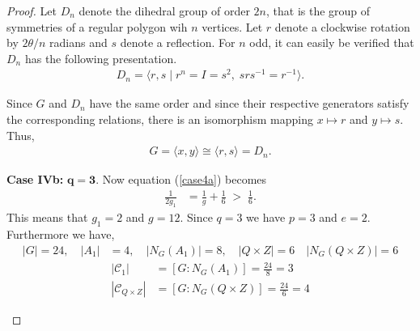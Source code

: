 \documentclass[a4paper , 11pt]{book}
\theoremstyle{definition}
\theoremstyle{remark}
\begin{document}
\begin{proof}
Let $D_n$ denote the dihedral group of order $2n$, that is the group of symmetries of a regular polygon wih $n$ vertices. Let $r$ denote a clockwise rotation by $2\theta /n$ radians and $s$ denote a reflection. For $n$ odd, it can easily be verified that $D_n$ has the following presentation.
\begin{align*} D_n = \langle r, s \; | \; r^n = I = s^2, \; s r s^{-1} = r^{-1} \rangle.
\end{align*}

Since $G$ and $D_n$ have the same order and since their respective generators satisfy the corresponding relations, there is an isomorphism mapping $x \mapsto r$ and $y \mapsto s$. Thus,
\begin{align*} G = \langle x, y \rangle \cong \langle r, s \rangle = D_n.
\end{align*}

\textbullet \space \textbf{Case IVb:} $\pmb{q = 3}$. Now equation (\ref{case4a}) becomes
\begin{align*} \frac{1}{2g_1} &= \frac{1}{g} + \frac{1}{6} \; > \; \frac{1}{6}.
\end{align*}
This means that $g_1 = 2$ and $g = 12$. Since $q=3$ we have $p=3$ and $e=2$. Furthermore we have,
\begin{align*} |G| = 24, \quad |A_1| &= 4,  \quad |N_G(A_1)| = 8, \quad |Q \times Z| = 6 \quad |N_G(Q \times Z)| = 6
\end{align*}
\begin{align*} |\mathcal{C}_1| &= [G : N_G(A_1)] = \frac{24}{8} = 3
\\ |\mathcal{C}_{Q \times Z}| &= [G : N_G(Q \times Z)] = \frac{24}{6} = 4
\end{align*}
\begin{center}
\end{center}
\end{proof}
\end{document}
